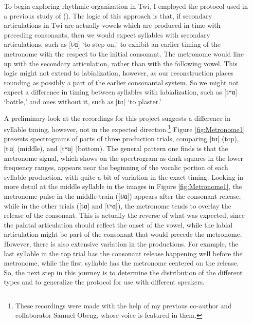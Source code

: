 \documentclass[output=paper,colorlinks,citecolor=brown]{langscibook}
\begin{document}
To begin exploring rhythmic organization in Twi, I employed the protocol used in a previous study of  (\citealt{Lin_deJong2023}). The logic of this approach is that, if secondary articulations in Twi are actually vowels which are produced in time with preceding consonants, then we would expect syllables with secondary articulations, such as [tʲɑ] ‘to step on,’ to exhibit an earlier timing of the metronome with the respect to the initial consonant.  The metronome would line up with the secondary articulation, rather than with the following vowel. This logic might not extend to labialization, however, as our reconstruction places rounding as possibly a part of the earlier consonantal system. So we might not expect a difference in timing between syllables with labialization, such as [tʷɑ] ‘bottle,’ and ones without it, such as [tɑ] ‘to plaster.’ 

A preliminary look at the recordings for this project suggests a difference in syllable timing, however, not in the expected direction.\footnote{These recordings were made with the help of my previous co-author and collaborator Samuel Obeng,  whose voice is featured in them.} Figure \ref{fig:Metronome1} presents spectrograms of parts of three production trials, comparing [tɑ] (top), [tʲɑ] (middle), and [tʷɑ] (bottom). The general pattern one finds is that the metronome signal, which shows on the spectrogram as dark squares in the lower frequency ranges, appears near the beginning of the vocalic portion of each syllable production, with quite a bit of variation in the exact timing. Looking in more detail at the middle syllable in the images in Figure \ref{fig:Metronome1}, the metronome pulse in the middle train ([tʲɑ]) appears after the consonant release, while in the other trials ([tɑ] and [tʷɑ]), the metronome tends to overlay the release of the consonant. This is actually the reverse of what was expected, since the palatal articulation should reflect the onset of the vowel, while the labial articulation might be part of the consonant that would precede the metronome. However, there is also extensive variation in the productions. For example, the last syllable in the top trial has the consonant release happening well before the metronome, while the first syllable has the metronome centered on the release. So, the next step in this journey is to determine the distribution of the different types and to generalize the protocol for use with different speakers. 

\end{document}
